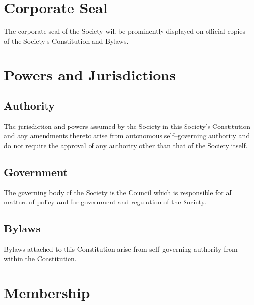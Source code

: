 \newpage
\section{Corporate Seal}
The corporate seal of the Society will be prominently displayed on official copies of the Society's Constitution and Bylaws.

\newpage
\section{Powers and Jurisdictions}
\subsection{Authority}
The jurisdiction and powers assumed by the Society in this Society's Constitution and any amendments thereto arise from autonomous self--governing authority and do not require the approval of any authority other than that of the Society itself. 
\subsection{Government}
The governing body of the Society is the Council which is responsible for all matters of policy and for government and regulation of the Society. 
\subsection{Bylaws}
Bylaws attached to this Constitution arise from self--governing authority from within the Constitution.
\newpage

\section{Membership}

